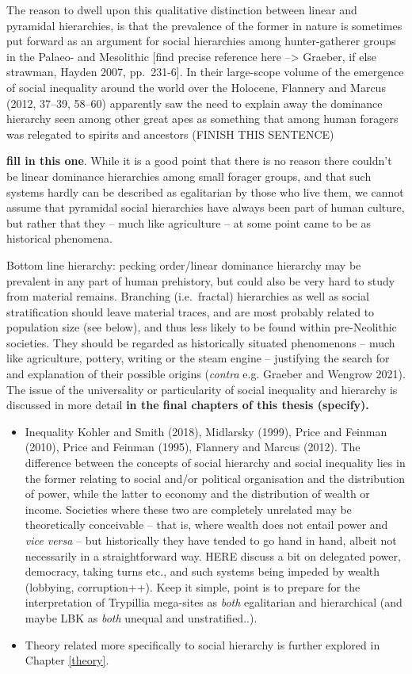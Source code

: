 \documentclass[
  12pt,
  a4paper, twoside]{book}
\providecommand{\tightlist}{%
  \setlength{\itemsep}{0pt}\setlength{\parskip}{0pt}}
\begin{document}
The reason to dwell upon this qualitative distinction between linear and pyramidal hierarchies, is that the prevalence of the former in nature is sometimes put forward as an argument for social hierarchies among hunter-gatherer groups in the Palaeo- and Mesolithic {[}find precise reference here --\textgreater{} Graeber, if else strawman, Hayden 2007, pp.~231-6{]}. In their large-scope volume of the emergence of social inequality around the world over the Holocene, Flannery and Marcus (2012, 37--39, 58--60) apparently saw the need to explain away the dominance hierarchy seen among other great apes as something that among human foragers was relegated to spirits and ancestors (FINISH THIS SENTENCE)

\textbf{fill in this one}. While it is a good point that there is no reason there couldn't be linear dominance hierarchies among small forager groups, and that such systems hardly can be described as egalitarian by those who live them, we cannot assume that pyramidal social hierarchies have always been part of human culture, but rather that they -- much like agriculture -- at some point came to be as historical phenomena.

Bottom line hierarchy: pecking order/linear dominance hierarchy may be prevalent in any part of human prehistory, but could also be very hard to study from material remains. Branching (i.e.~fractal) hierarchies as well as social stratification should leave material traces, and are most probably related to population size (see below), and thus less likely to be found within pre-Neolithic societies. They should be regarded as historically situated phenomenons -- much like agriculture, pottery, writing or the steam engine -- justifying the search for and explanation of their possible origins (\emph{contra} e.g. Graeber and Wengrow 2021). The issue of the universality or particularity of social inequality and hierarchy is discussed in more detail \textbf{in the final chapters of this thesis (specify).}

\begin{itemize}
\tightlist
\item
  Inequality Kohler and Smith (2018), Midlarsky (1999), Price and Feinman (2010), Price and Feinman (1995), Flannery and Marcus (2012). The difference between the concepts of social hierarchy and social inequality lies in the former relating to social and/or political organisation and the distribution of power, while the latter to economy and the distribution of wealth or income. Societies where these two are completely unrelated may be theoretically conceivable -- that is, where wealth does not entail power and \emph{vice versa} -- but historically they have tended to go hand in hand, albeit not necessarily in a straightforward way. HERE discuss a bit on delegated power, democracy, taking turns etc., and such systems being impeded by wealth (lobbying, corruption++). Keep it simple, point is to prepare for the interpretation of Trypillia mega-sites as \emph{both} egalitarian and hierarchical (and maybe LBK as \emph{both} unequal and unstratified..).
\item
  Theory related more specifically to social hierarchy is further explored in Chapter \ref{theory}.
\end{itemize}
\end{document}
